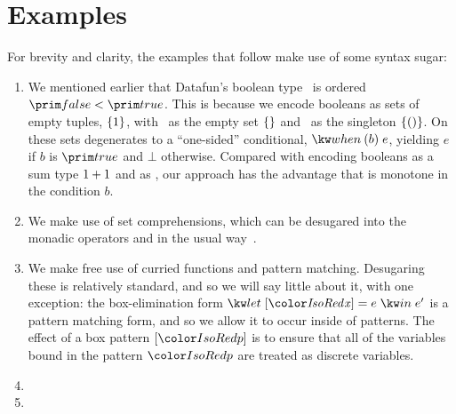 \section{Examples}
\label{examples}



For brevity and clarity, the examples that follow make use of some syntax sugar:

\begin{enumerate}

\item We mentioned earlier that Datafun's boolean type \tbool\ is ordered
  $\efalse < \etrue$. This is because we encode booleans as sets of empty
  tuples, $\{{1}\}$, with \efalse\ as the empty set $\{{}\}$ and
  \etrue\ as the singleton $\{{({})}\}$. On these sets 
  degenerates to a ``one-sided'' conditional, $\ewhen b e$, yielding
  $e$ if $b$ is $\etrue$ and $\bot$ otherwise. Compared with encoding booleans
  as a sum type \(1 + 1\) and  as , our approach has
  the advantage that  is monotone in the condition $b$.


\item We make use of set comprehensions, which can be desugared into the monadic
  operators  and  in the usual
  way~\cite{wadler-monad-comprehensions}.


\item We make free use of curried functions and pattern matching. Desugaring
  these is relatively standard, and so we will say little about it, with one
  exception: the box-elimination form $\eletbox x e e'$ is a pattern matching
  form, and so we allow it to occur inside of patterns. The effect of a box
  pattern $\pbox{\isocolor p}$ is to ensure that all of the variables bound in
  the pattern $\isocolor p$ are treated as discrete variables.

\item {}

\item {}
\end{enumerate}

